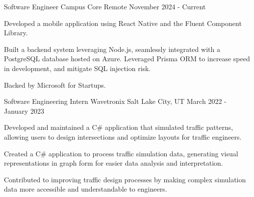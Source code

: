 \begin{cventries}

\cventry
{Software Engineer} %
{Campus Core} %
{Remote} %
{November 2024 - Current} %
{ %
\begin{cvitems}
\item {Developed a mobile application using React Native and the Fluent Component Library.}
\item {Built a backend system leveraging Node.js, seamlessly integrated with a PostgreSQL database hosted on Azure. Leveraged Prisma ORM to increase speed in development, and mitigate SQL injection risk.}
\item {Backed by Microsoft for Startups.}
\end{cvitems}
}


\cventry
{Software Engineering Intern} %
{Wavetronix} %
{Salt Lake City, UT} %
{March 2022 - January 2023} %
{ %
\begin{cvitems}
\item {Developed and maintained a C\# application that simulated traffic patterns, allowing users to design intersections and optimize layouts for traffic engineers.}
\item {Created a C\# application to process traffic simulation data, generating visual representations in graph form for easier data analysis and interpretation.}
\item {Contributed to improving traffic design processes by making complex simulation data more accessible and understandable to engineers.}
\end{cvitems}
}


\end{cventries}